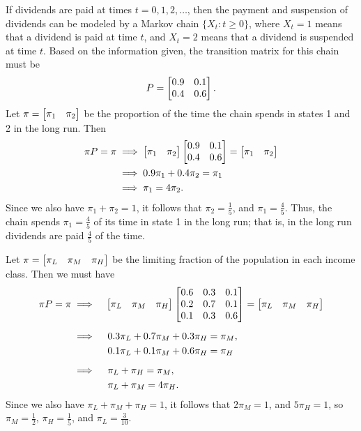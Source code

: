 \documentclass{homework}
\begin{document}
	\maketitle
	
	\question If dividends are paid at times $t =0,1,2,\dots$, then the payment and suspension of dividends can be modeled by a Markov chain $\{X_t : t\ge 0\}$, where $X_t = 1$ means that a dividend is paid at time $t$, and $X_t = 2$ means that a dividend is suspended at time $t$. Based on the information given, the transition matrix for this chain must be
	\begin{equation*}
		P = \left[\begin{matrix}0.9 &0.1 \\ 0.4 & 0.6\end{matrix}\right].
	\end{equation*}
	Let $\pi = \left[\begin{matrix}\pi_1 & \pi_2\end{matrix}\right]$ be the proportion of the time the chain spends in states 1 and 2 in the long run. Then
	\begin{align*}
		\pi P = \pi &\implies \left[\begin{matrix}\pi_1 & \pi_2\end{matrix}\right] \left[\begin{matrix}0.9 &0.1 \\ 0.4 & 0.6\end{matrix}\right] = \left[\begin{matrix}\pi_1 & \pi_2\end{matrix}\right]\\
		&\implies 0.9\pi_1 + 0.4\pi_2 = \pi_1 \\
		&\implies \pi_1 = 4\pi_2.
	\end{align*}
	Since we also have $\pi_1 + \pi_2 = 1$, it follows that $\pi_2 = \frac{1}{5}$, and $\pi_1 = \frac{4}{5}$. Thus, the chain spends $\pi_1 = \frac{4}{5}$ of its time in state 1 in the long run; that is, in the long run dividends are paid $\frac{4}{5}$ of the time.
	
	\question Let $\pi = \left[\begin{matrix}\pi_L & \pi_M & \pi_H\end{matrix}\right]$ be the limiting fraction of the population in each income class. Then we must have
	\begin{alignat*}{2}
		\pi P = \pi &\implies&& \left[\begin{matrix}\pi_L & \pi_M & \pi_H\end{matrix}\right]\left[\begin{matrix}0.6 & 0.3 & 0.1 \\ 0.2 & 0.7 & 0.1 \\ 0.1 & 0.3 & 0.6\end{matrix}\right] = \left[\begin{matrix}\pi_L & \pi_M & \pi_H\end{matrix}\right] \\[0.5em]
		&\implies&&\; 0.3\pi_L + 0.7\pi_M + 0.3\pi_H = \pi_M, \\
		&&&\; 0.1\pi_L + 0.1\pi_M + 0.6\pi_H = \pi_H \\[0.5em]
		&\implies&&\; \pi_L + \pi_H = \pi_M, \\
		&&&\; \pi_L + \pi_M = 4\pi_H.
	\end{alignat*}
	Since we also have $\pi_L + \pi_M + \pi_H = 1$, it follows that $2\pi_M = 1$, and $5\pi_H = 1$, so $\pi_M = \frac{1}{2}$, $\pi_H = \frac{1}{5}$, and $\pi_L = \frac{3}{10}$.
	
\end{document}
